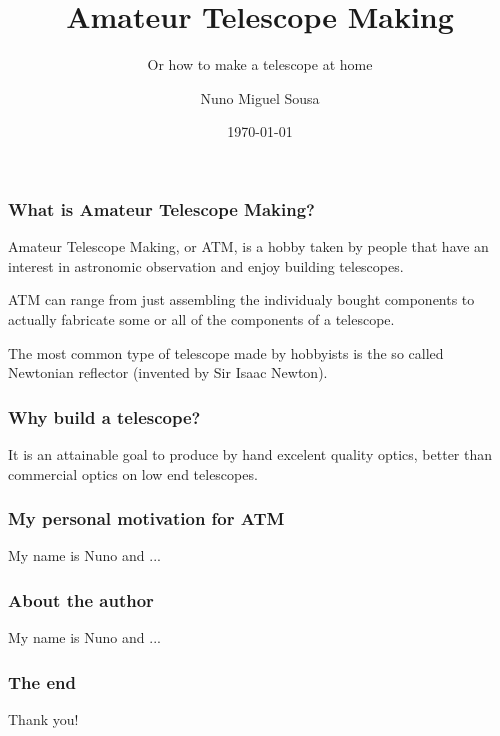 \documentclass{beamer}
\title{Amateur Telescope Making}
\subtitle{Or how to make a telescope at home}
\author{Nuno Miguel Sousa}
\institute{Coimbra, Portugal}
\date{\today}
\begin{document}
\begin{frame}
\titlepage
\end{frame}

\begin{frame}
\frametitle{What is Amateur Telescope Making?}
\begin{block}{}
Amateur Telescope Making, or ATM, is a hobby taken by people that have an interest in astronomic observation and enjoy building telescopes.\footnotemark
\end{block}
\begin{block}{}
ATM can range from just assembling the individualy bought components to actually fabricate some or all of the components of a telescope.
\end{block}
\begin{block}{}
The most common type of telescope made by hobbyists is the so called Newtonian reflector (invented by Sir Isaac Newton).\footnotemark
\end{block}
\end{frame}

\begin{frame}
\frametitle{Why build a telescope?}
\begin{block}
It is an attainable goal to produce by hand excelent quality optics, better than commercial optics on low end telescopes.\footnotemark
\end{block}
\end{frame}

\begin{frame}
\frametitle{My personal motivation for ATM}
My name is Nuno and ...
\end{frame}

\begin{frame}
\frametitle{About the author}
My name is Nuno and ...
\end{frame}

\begin{frame}
\frametitle{The end}
Thank you!
\end{frame}
\end{document}
